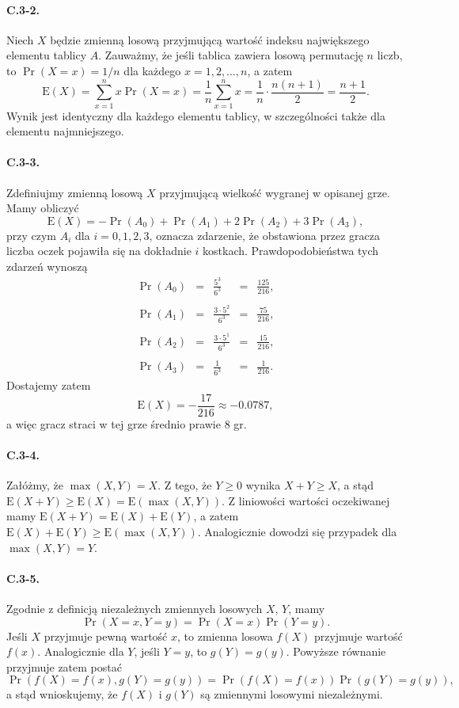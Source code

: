 \paragraph{C.3-2.}
Niech $X$ będzie zmienną losową przyjmującą wartość indeksu największego elementu tablicy $A$. Zauważmy, że jeśli tablica zawiera losową permutację $n$ liczb, to $\Pr(X=x)=1/n$ dla każdego $x=1,2,\dots,n$, a zatem
\[
	\mathrm{E}(X) = \sum_{x=1}^nx\Pr(X=x) = \frac{1}{n}\sum_{x=1}^nx = \frac{1}{n}\cdot\frac{n(n+1)}{2} = \frac{n+1}{2}.
\]
Wynik jest identyczny dla każdego elementu tablicy, w szczególności także dla elementu najmniejszego.

\paragraph{C.3-3.}
Zdefiniujmy zmienną losową $X$ przyjmującą wielkość wygranej w opisanej grze. Mamy obliczyć
\[
	\mathrm{E}(X) = -\Pr(A_0)+\Pr(A_1)+2\Pr(A_2)+3\Pr(A_3),
\]
przy czym $A_i$ dla $i=0,1,2,3$, oznacza zdarzenie, że obstawiona przez gracza liczba oczek pojawiła się na dokładnie $i$ kostkach. Prawdopodobieństwa tych zdarzeń wynoszą
\[
\begin{array}{rcccr}
	\Pr(A_0) &=& {\displaystyle\frac{5^3}{6^3}} &=& {\displaystyle\frac{125}{216}}, \\\\
	\Pr(A_1) &=& {\displaystyle\frac{3\cdot 5^2}{6^3}} &=& {\displaystyle\frac{75}{216}}, \\\\
	\Pr(A_2) &=& {\displaystyle\frac{3\cdot 5^1}{6^3}} &=& {\displaystyle\frac{15}{216}}, \\\\
	\Pr(A_3) &=& {\displaystyle\frac{1}{6^3}} &=& {\displaystyle\frac{1}{216}}.
\end{array}
\]
Dostajemy zatem
\[
	\mathrm{E}(X) = -\frac{17}{216}\approx -0.0787,
\]
a więc gracz straci w tej grze średnio prawie $8$ gr.

\paragraph{C.3-4.}
Załóżmy, że $\max (X,Y)=X$. Z tego, że $Y\ge 0$ wynika $X+Y\ge X$, a stąd $\mathrm{E}(X+Y)\ge\mathrm{E}(X)=\mathrm{E}(\max (X,Y))$. Z liniowości wartości oczekiwanej mamy $\mathrm{E}(X+Y)=\mathrm{E}(X)+\mathrm{E}(Y)$, a zatem $\mathrm{E}(X)+\mathrm{E}(Y)\ge\mathrm{E}(\max (X,Y))$. Analogicznie dowodzi się przypadek dla $\max (X,Y)=Y$.

\paragraph{C.3-5.}
Zgodnie z definicją niezależnych zmiennych losowych $X$, $Y$, mamy
\[
	\Pr(X=x,Y=y) = \Pr(X=x)\Pr(Y=y).
\]
Jeśli $X$ przyjmuje pewną wartość $x$, to zmienna losowa $f(X)$ przyjmuje wartość $f(x)$. Analogicznie dla $Y$, jeśli $Y=y$, to $g(Y)=g(y)$. Powyższe równanie przyjmuje zatem postać
\[
	\Pr(f(X)=f(x),g(Y)=g(y)) = \Pr(f(X)=f(x))\Pr(g(Y)=g(y)),
\]
a stąd wnioskujemy, że $f(X)$ i $g(Y)$ są zmiennymi losowymi niezależnymi.

